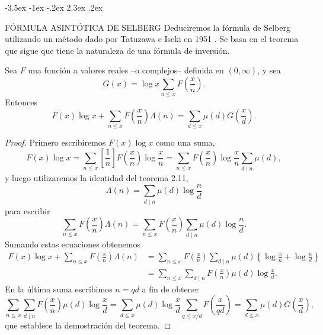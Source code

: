 \documentclass[12pt,a4paper]{book}
\makeatletter
\renewcommand\section{\@startsection{section}{1}{\z@}%
  {-3.5ex \@plus -1ex \@minus -.2ex}%
  {2.3ex \@plus .2ex}%
  {\normalfont\Large\bfseries\raggedright}}
\makeatother
\begin{document}
    \section{FÓRMULA ASINTÓTICA DE SELBERG}
    Deduciremos la fórmula de Selberg \cite{selberg1949} utilizando un método dado por Tatuzawa e Iseki
    en 1951 \cite{tatuzawa1951}. Se basa en el teorema que sigue que tiene la naturaleza de una fórmula
    de inversión.

    \begin{teorema}
        Sea $F$ una función a valores reales --o complejos-- definida en $(0,\infty)$,
        y sea
        \begin{equation*}
            G(x)=\log x\sum_{n\leq x}F\left(\frac{x}{n}\right).
        \end{equation*}
        Entonces
        \begin{equation*}
            F(x)\log x+\sum_{n\leq x}F\left(\frac{x}{n}\right)\Lambda(n)
            =\sum_{d\leq x}\mu(d)G\left(\frac{x}{d}\right).
        \end{equation*}
    \end{teorema}

    \begin{proof}
        Primero escribiremos $F(x)\log x$ como una suma,
        \begin{equation*}
            F(x)\log x=\sum_{n\leq x}\left[\frac{1}{n}\right]F\left(\frac{x}{n}\right)\log\frac{x}{n}
            =\sum_{n\leq x}F\left(\frac{x}{n}\right)\log\frac{x}{n}\sum_{d\mid n}\mu(d),
        \end{equation*}
        y luego utilizaremos la identidad del teorema 2.11,
        \begin{equation*}
            \Lambda(n)=\sum_{d\mid n}\mu(d)\log\frac{n}{d}
        \end{equation*}
        para escribir
        \begin{equation*}
            \sum_{n\leq x}F\left(\frac{x}{n}\right)\Lambda(n)
            =\sum_{n\leq x}F\left(\frac{x}{n}\right)\sum_{d\mid n}\mu(d)\log\frac{n}{d}.
        \end{equation*}
        Sumando estas ecuaciones obtenemos
        \begin{align*}
            F(x)\log x+\sum_{n\leq x}F\left(\frac{x}{n}\right)\Lambda(n)
            &=\sum_{n\leq x}F\left(\frac{x}{n}\right)\sum_{d\mid n}\mu(d)
            \left\{\log\frac{x}{n}+\log\frac{n}{d}\right\}\\
            &=\sum_{n\leq x}\sum_{d\mid n}F\left(\frac{x}{n}\right)\mu(d)\log\frac{x}{d}.
        \end{align*}
        En la última suma escribimos $n=qd$ a fin de obtener
        \begin{equation*}
            \sum_{n\leq x}\sum_{d\mid n}F\left(\frac{x}{n}\right)\mu(d)\log\frac{x}{d}
            =\sum_{d\leq x}\mu(d)\log\frac{x}{d}\sum_{q\leq x/d}F\left(\frac{x}{qd}\right)
            =\sum_{d\leq x}\mu(d)G\left(\frac{x}{d}\right),
        \end{equation*}
        que establece la demostración del teorema.
    \end{proof}
\end{document}
